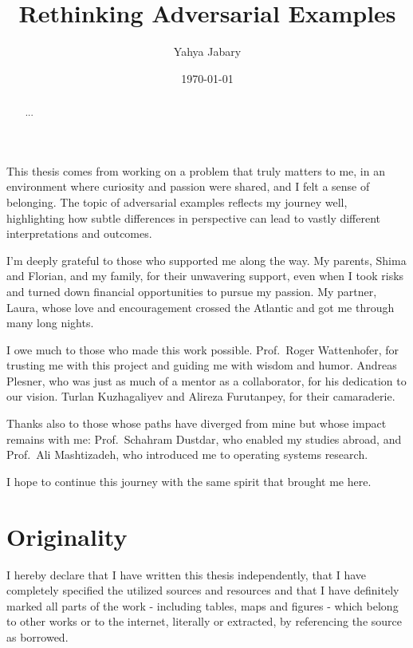 \documentclass[a4paper, oneside]{discothesis}
\title{Rethinking Adversarial Examples}
\author{Yahya Jabary}
\institute{Computer Engineering and Networks Laboratory \\[2pt] ETH Zürich}
\date{\today}
\begin{document}
\frontmatter
\maketitle

\cleardoublepage

\begin{acknowledgements}
	This thesis comes from working on a problem that truly matters to me, in an environment where curiosity and passion were shared, and I felt a sense of belonging. The topic of adversarial examples reflects my journey well, highlighting how subtle differences in perspective can lead to vastly different interpretations and outcomes.

	I'm deeply grateful to those who supported me along the way. My parents, Shima and Florian, and my family, for their unwavering support, even when I took risks and turned down financial opportunities to pursue my passion. My partner, Laura, whose love and encouragement crossed the Atlantic and got me through many long nights.
	
	I owe much to those who made this work possible. Prof.\ Roger Wattenhofer, for trusting me with this project and guiding me with wisdom and humor. Andreas Plesner, who was just as much of a mentor as a collaborator, for his dedication to our vision. Turlan Kuzhagaliyev and Alireza Furutanpey, for their camaraderie.
	
	Thanks also to those whose paths have diverged from mine but whose impact remains with me: Prof.\ Schahram Dustdar, who enabled my studies abroad, and Prof.\ Ali Mashtizadeh, who introduced me to operating systems research.
	
	I hope to continue this journey with the same spirit that brought me here.
\end{acknowledgements}

\begin{abstract}
	...
\end{abstract}

\chapter*{Originality}

I hereby declare that I have written this thesis independently, that I have completely specified the utilized sources and resources and that I have definitely marked all parts of the work - including tables, maps and figures - which belong to other works or to the internet, literally or extracted, by referencing the source as borrowed.
\end{document}
